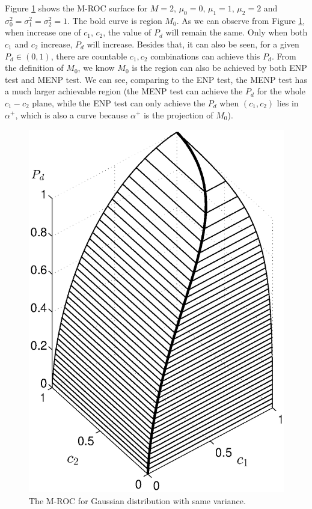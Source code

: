 Figure \ref{pic: surface for same variance} shows the M-ROC surface for $M=2$, $\mu_0 = 0$, $\mu_1 = 1$, $\mu_2 = 2$ and $\sigma_0^2 = \sigma_1^2 = \sigma_2^2 = 1$. The bold curve is region $M_0$. 
As we can observe from Figure \ref{pic: surface for same variance}, when increase one of $c_1$, $c_2$, the value of $P_d$ will remain the same. Only when both $c_1$ and $c_2$ increase, $P_d$ will increase. Besides that, it can also be seen, for a given $P_d \in (0, 1)$, there are countable $c_1, c_2$ combinations can achieve this $P_d$.   
From the definition of $M_0$, we know $M_0$ is the region can also be achieved by both ENP test and MENP test. We can see, comparing to the ENP test, the MENP test has a much larger achievable region (the MENP test can achieve the $P_d$ for the whole $c_1-c_2$ plane, while the ENP test can only achieve the $P_d$ when $(c_1, c_2)$ lies in $\alpha^+$, which is also a curve because $\alpha^+$ is the projection of $M_0$). 

\begin{figure}[!t]
\centering
\includegraphics[width=12cm, height=16cm]{3/gaussian.eps}
\caption{The M-ROC for Gaussian distribution with same variance.}
\label{pic: surface for same variance}
\end{figure}
